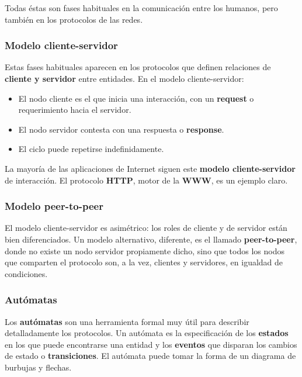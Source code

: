 \documentclass[spanish,A4,]{article}
\begin{document}
Todas éstas son fases habituales en la comunicación entre los humanos,
pero también en los protocolos de las redes.

\subsubsection{Modelo cliente-servidor}\label{modelo-cliente-servidor}

Estas fases habituales aparecen en los protocolos que definen relaciones
de \textbf{cliente y servidor} entre entidades. En el modelo
cliente-servidor:

\begin{itemize}
\itemsep1pt\parskip0pt
\item
  El nodo cliente es el que inicia una interacción, con un
  \textbf{request} o requerimiento hacia el servidor.
\item
  El nodo servidor contesta con una respuesta o \textbf{response}.
\item
  El ciclo puede repetirse indefinidamente.
\end{itemize}

La mayoría de las aplicaciones de Internet siguen este \textbf{modelo
cliente-servidor} de interacción. El protocolo \textbf{HTTP}, motor de
la \textbf{WWW}, es un ejemplo claro.

\subsubsection{Modelo peer-to-peer}\label{modelo-peer-to-peer}

El modelo cliente-servidor es asimétrico: los roles de cliente y de
servidor están bien diferenciados. Un modelo alternativo, diferente, es
el llamado \textbf{peer-to-peer}, donde no existe un nodo servidor
propiamente dicho, sino que todos los nodos que comparten el protocolo
son, a la vez, clientes y servidores, en igualdad de condiciones.

\subsubsection{Autómatas}\label{autuxf3matas}

Los \textbf{autómatas} son una herramienta formal muy útil para
describir detalladamente los protocolos. Un autómata es la
especificación de los \textbf{estados} en los que puede encontrarse una
entidad y los \textbf{eventos} que disparan los cambios de estado o
\textbf{transiciones}. El autómata puede tomar la forma de un diagrama
de burbujas y flechas.
\end{document}
